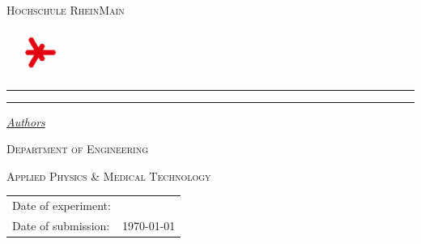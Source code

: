 \begin{titlepage} 
	\newcommand{\HRule}{\rule{\linewidth}{0.5mm}} 	
	\centering
	\textsc{\Large Hochschule RheinMain} \par
	\begin{center}
		\includegraphics[width=0.15\textwidth]{logo-hsrm.jpg}
	\end{center}%
	\textsc{\LARGE \titelLV}\vspace{0.5cm}
		\HRule\vspace{0.4cm}
	{\huge\bfseries \untertitela}\par\vspace{0.4cm} %
	{\huge\bfseries \untertitelb}\par\vspace{0.4cm} %
		\HRule\vspace{1.5cm}
	\begin{minipage}{0.4\textwidth}
		\large
		\textit{\underline{Authors}}\par\vspace{0.5cm}
		\textsc{\nameA}\par\vspace{0.5cm}
		\textsc{\nameB}\par\vspace{0.5cm}
		\textsc{\nameC}\par\vspace{0.5cm}
\end{minipage}
\vfill\vfill\vfill 
\textsc{\Large Department of Engineering}\par\vspace{0.5cm}
\textsc{\large Applied Physics \& Medical Technology}\par\vspace{0.5cm}
\vfill
\begin{tabular}{ll}
	Date of experiment:\hspace{0.4cm} &{\large\dateLVa}\\
	Date of submission:\hspace{0.4cm} &{\large\today} 
\end{tabular}
\end{titlepage}

